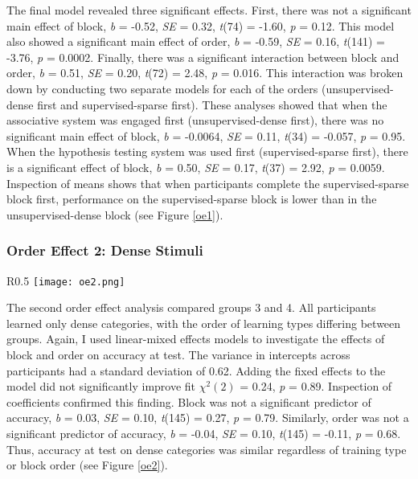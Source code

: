 \documentclass[../dissertation.tex]{subfiles}
\begin{document}
	The final model revealed three significant effects. First, there was not a significant main effect of block, \textit{b} = -0.52, \textit{SE} = 0.32, \textit{t}(74) = -1.60, \textit{p} = 0.12. This model also showed a significant main effect of order, \textit{b} = -0.59, \textit{SE} = 0.16, \textit{t}(141) = -3.76, \textit{p} = 0.0002. Finally, there was a significant interaction between block and order, \textit{b} = 0.51, \textit{SE} = 0.20, \textit{t}(72) = 2.48, \textit{p} = 0.016. This interaction was broken down by conducting two separate models for each of the orders (unsupervised-dense first and supervised-sparse first). These analyses showed that when the associative system was engaged first (unsupervised-dense first), there was no significant main effect of block, \textit{b} = -0.0064, \textit{SE} = 0.11, \textit{t}(34) = -0.057, \textit{p} = 0.95. When the hypothesis testing system was used first (supervised-sparse first), there is a significant effect of block, \textit{b} = 0.50, \textit{SE} = 0.17, \textit{t}(37) = 2.92, \textit{p} = 0.0059. Inspection of means shows that when participants complete the supervised-sparse block first, performance on the supervised-sparse block is lower than in the unsupervised-dense block (see Figure \ref{oe1}).

\subsubsection{Order Effect 2: Dense Stimuli}
\begin{wrapfigure}{R}{0.5\textwidth}
\vspace{-10pt}
\texttt{[image: oe2.png]}
\caption[Accuracy plot for order effect 2]{Accuracy (d') for each block completed by each group for the second order effect.}
\label{oe2}
\vspace{-10pt}
\end{wrapfigure}	
	The second order effect analysis compared groups 3 and 4. All participants learned only dense categories, with the order of learning types differing between groups. Again, I used linear-mixed effects models to investigate the effects of block and order on accuracy at test. The variance in intercepts across participants had a standard deviation of 0.62. Adding the fixed effects to the model did not significantly improve fit $\chi^{2}(2)$ = 0.24,  \textit{p} = 0.89. Inspection of coefficients confirmed this finding. Block was not a significant predictor of accuracy, \textit{b} = 0.03, \textit{SE} = 0.10, \textit{t}(145) = 0.27, \textit{p} = 0.79. Similarly, order was not a significant predictor of accuracy, \textit{b} = -0.04, \textit{SE} = 0.10, \textit{t}(145) = -0.11, \textit{p} = 0.68. Thus, accuracy at test on dense categories was similar regardless of training type or block order (see Figure \ref{oe2}).
\end{document}
